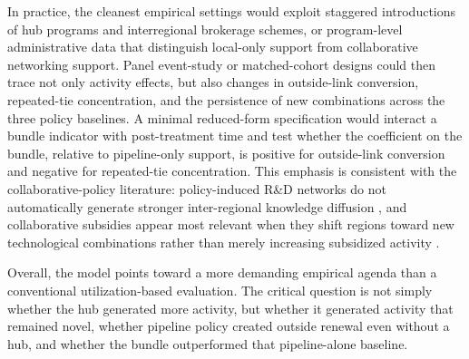 In practice, the cleanest empirical settings would exploit staggered introductions of hub programs and interregional brokerage schemes, or program-level administrative data that distinguish local-only support from collaborative networking support. Panel event-study or matched-cohort designs could then trace not only activity effects, but also changes in outside-link conversion, repeated-tie concentration, and the persistence of new combinations across the three policy baselines. A minimal reduced-form specification would interact a bundle indicator with post-treatment time and test whether the coefficient on the bundle, relative to pipeline-only support, is positive for outside-link conversion and negative for repeated-tie concentration. This emphasis is consistent with the collaborative-policy literature: policy-induced R\&D networks do not automatically generate stronger inter-regional knowledge diffusion \citep{BednarzBroekel2019}, and collaborative subsidies appear most relevant when they shift regions toward new technological combinations rather than merely increasing subsidized activity \citep{MewesBroekel2020}.

Overall, the model points toward a more demanding empirical agenda than a conventional utilization-based evaluation. The critical question is not simply whether the hub generated more activity, but whether it generated activity that remained novel, whether pipeline policy created outside renewal even without a hub, and whether the bundle outperformed that pipeline-alone baseline.
